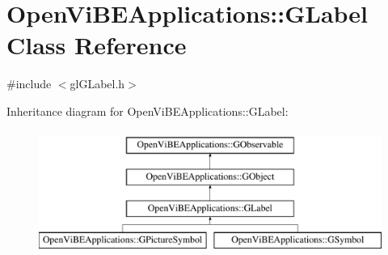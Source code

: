 \hypertarget{classOpenViBEApplications_1_1GLabel}{
\section{OpenViBEApplications::GLabel Class Reference}
\label{classOpenViBEApplications_1_1GLabel}
}


{\ttfamily \#include $<$glGLabel.h$>$}

Inheritance diagram for OpenViBEApplications::GLabel:\begin{figure}[H]
\begin{center}
\leavevmode
\includegraphics[height=4.000000cm]{classOpenViBEApplications_1_1GLabel}
\end{center}
\end{figure}
